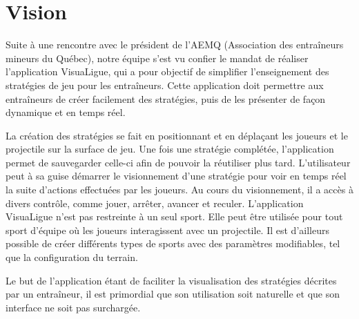 %

\chapter{Vision}
\label{s:vision}

Suite à une rencontre avec le président de l'AEMQ (Association des entraîneurs mineurs du Québec), notre équipe s'est vu confier le mandat de réaliser l'application VisuaLigue, qui a pour objectif de simplifier l'enseignement des stratégies de jeu pour les entraîneurs.
Cette application doit permettre aux entraîneurs de créer facilement des stratégies, puis de les présenter de façon dynamique et en temps réel.

La création des stratégies se fait en positionnant et en déplaçant les joueurs et le projectile sur la surface de jeu.
Une fois une stratégie complétée, l'application permet de sauvegarder celle-ci afin de pouvoir la réutiliser plus tard.
L'utilisateur peut à sa guise démarrer le visionnement d'une stratégie pour voir en temps réel la suite d'actions effectuées par les joueurs.
Au cours du visionnement, il a accès à divers contrôle, comme jouer, arrêter, avancer et reculer.
L'application VisuaLigue n'est pas restreinte à un seul sport.
Elle peut être utilisée pour tout sport d'équipe où les joueurs interagissent avec un projectile.
Il est d'ailleurs possible de créer différents types de sports avec des paramètres modifiables, tel que la configuration du terrain.

Le but de l'application étant de faciliter la visualisation des stratégies décrites par un entraîneur, il est primordial que son utilisation soit naturelle et que son interface ne soit pas surchargée.